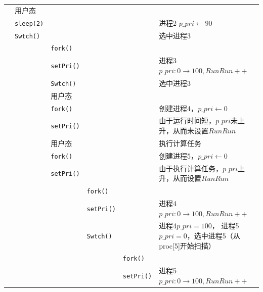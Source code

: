 \begin{landscape}
\begin{longtable}{llllll}
                 &     用户态            &         &           &             &            \\
                 &    \texttt{sleep(2)} &          &           &      & 进程2 $p\_pri\gets90$      \\
                 &     \texttt{Swtch()} &          &           &             &选中进程3                  \\
                 &                      & \texttt{fork()}       &           &             &  \\
                 &                      & \texttt{setPri()}    &           &             &进程3$p\_pri:0\rightarrow 100,RunRun++$ \\
                 &                      & \texttt{Swtch()}    &           &             &选中进程3 \\
                 &                      &用户态               &           &             & \\
                 &                      & \texttt{fork()}    &           &             &创建进程4，$p\_pri\gets0$                  \\
                 &                      & \texttt{setPri()}    &           &             &由于运行时间短，$p\_pri$未上升，从而未设置$RunRun$ \\
                 &                      &用户态              &           &             & 执行计算任务\\
                 &                      & \texttt{fork()}    &           &             &创建进程5，$p\_pri\gets0$                  \\
                 &                      & \texttt{setPri()}    &           &             &由于执行计算任务，$p\_pri$上升，从而设置$RunRun$ \\
                 &                      &     & \texttt{fork()}    &                        &\\
                 &                      &     & \texttt{setPri()}    &                        &进程4$p\_pri:0\rightarrow 100,RunRun++$ \\
                 &                      &     &\texttt{Swtch()}    &              &\makecell[l]{进程4$p\_pri=100$，\\进程5$p\_pri=0$，选中进程5（从proc[5]开始扫描）} \\
                 &                      &     &                &              \texttt{fork()}    &\\
                 &                      &     &                &              \texttt{setPri()}    &进程5$p\_pri:0\rightarrow 100,RunRun++$ \\

\end{longtable}
\end{landscape}
